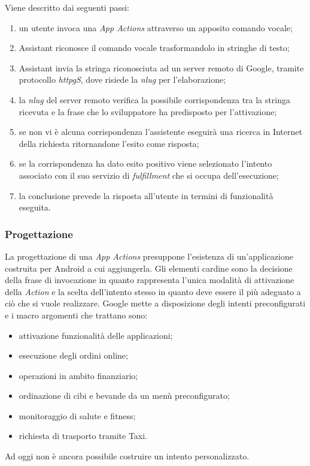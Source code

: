 		Viene descritto dai seguenti passi:
		\begin{enumerate}
			\item un utente invoca una \emph{App Actions} attraverso un apposito comando vocale;
			\item Assistant riconosce il comando vocale trasformandolo in stringhe di testo;
			\item Assistant invia la stringa riconosciuta ad un server remoto di Google, tramite protocollo \emph{\gls{httpg}S}, dove risiede la \emph{\gls{nlug}} per l'elaborazione;
			\item la \emph{\gls{nlug}} del server remoto verifica la possibile corrispondenza tra la stringa ricevuta e la frase che lo sviluppatore ha predisposto per l'attivazione;
			\item se non vi è alcuna corrispondenza l'assistente eseguirà una ricerca in Internet della richiesta ritornandone l'esito come risposta;
			\item se la corrispondenza ha dato esito positivo viene selezionato l'intento associato con il suo servizio di \emph{fulfillment} che si occupa dell'esecuzione;
			\item la conclusione prevede la risposta all'utente in termini di funzionalità eseguita.
		\end{enumerate}
		\subsubsection{Progettazione}
		La progettazione di una \emph{App Actions} presuppone l'esistenza di un'applicazione costruita per Android a cui aggiungerla. Gli elementi cardine sono la decisione della frase di invocazione in quanto rappresenta l'unica modalità di attivazione della \emph{Action} e la scelta dell'intento stesso in quanto deve essere il più adeguato a ciò che si vuole realizzare. Google mette a disposizione degli intenti preconfigurati e i macro argomenti che trattano sono:
		\begin{itemize}
			\item attivazione funzionalità delle applicazioni;
			\item esecuzione degli ordini online;
			\item operazioni in ambito finanziario;
			\item ordinazione di cibi e bevande da un menù preconfigurato;
			\item monitoraggio di salute e fitness;
			\item richiesta di trasporto tramite Taxi.
		\end{itemize}
		Ad oggi non è ancora possibile costruire un intento personalizzato.
